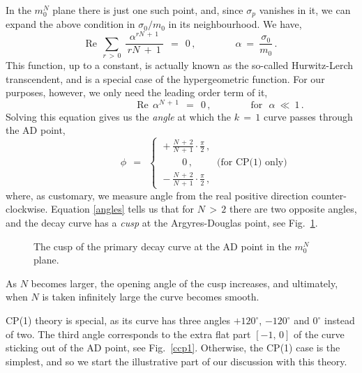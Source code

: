 \documentclass[epsfig,12pt]{article}
\def\beq{\begin{equation}}
\def\eeq{\end{equation}}
\def\beq{\begin{equation}}
\def\eeq{\end{equation}}
\begin{document}
	In the $ m_0^N $ plane there is just one such point, and, since $ \sigma_p $ vanishes in it, 
	we can expand the above condition in $ \sigma_0/m_0 $ in its neighbourhood.
	We have,
\beq
\label{alpha}
	\text{Re}~~ \sum_{r \,>\, 0}\: \frac{ \alpha^{r N \,+\, 1} }
                                          {\:  rN ~+~ 1 \:}          ~~=~~ 0\,,
	\qquad\qquad \alpha ~=~ \frac{\sigma_0}{m_0}\,.
\eeq
	This function, up to a constant, is actually known as the so-called Hurwitz-Lerch transcendent, 
	and is a special case of the hypergeometric function. 
	For our purposes, however, we only need the leading order term of it,
\beq
	\qquad\qquad\qquad\qquad
	\text{Re}~~ \alpha^{ N \,+\, 1 } ~~=~~ 0\,, \qquad\qquad \text{for~~} \alpha ~\ll~ 1\,.
\eeq
	Solving this equation gives us the {\it angle} at which the $ k \,=\, 1 $ curve passes through the AD point,
\beq
\label{angles}
	\qquad\qquad\quad        %
	\phi ~~=~~ \left \{ ~
		\begin{array}{l}
		   { \displaystyle
		    +\: \frac{ N \,+\, 2 }
                             { N \,+\, 1 }\cdot \frac{\pi}{2}\,,
                   }
		    \\[4mm]
		   { \displaystyle
		    ~~~~~~~~~0\,, \qquad~~ \text{(for CP(1) only)}
                   }
		    \\[3mm]
		   { \displaystyle
		    -\: \frac{ N \,+\, 2 }
                             { N \,+\, 1 }\cdot \frac{\pi}{2}\,,
                   }
		\end{array}
		\right.
\eeq
	where, as customary, we measure angle from the real positive direction counter-clockwise.
	Equation \eqref{angles} tells us that for $ N \,>\, 2 $ there are two opposite angles, and 
	the decay curve has a {\it cusp} at the Argyres-Douglas point, see Fig.~\ref{cusp}.
\begin{figure}
\begin{center}
\epsfxsize=6.0cm
\caption{The cusp of the primary decay curve at the AD point in the $ m_0^N $ plane.}
\label{cusp}
\end{center}
\end{figure}
	As $ N $ becomes larger, the opening angle of the cusp increases, and ultimately,
	when $ N $ is taken infinitely large the curve becomes smooth.

	CP(1) theory is special, as its curve has three angles $ +120^\circ $, $ -120^\circ $ and $ 0^\circ $ instead of two.
	The third angle corresponds to the extra flat part $ [-1,\, 0] $ of the curve sticking out of the AD point,
	see Fig.~\ref{ccp1}.
	Otherwise, the CP(1) case is the simplest, and so we start the illustrative part of our discussion with this theory.
\end{document}
